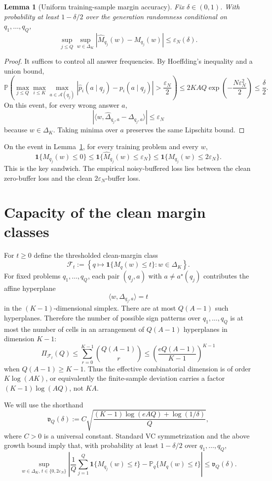 \documentclass[11pt]{article}
\newtheorem{lemma}{Lemma}
\newcommand{\A}{\mathcal A}
\newcommand{\Pp}{\mathbb P}
\newcommand{\one}{\mathbf 1}
\newcommand{\eps}{\varepsilon}
\begin{document}
\begin{lemma}[Uniform training-sample margin accuracy]
\label{lem:margin-accuracy}
Fix $\delta\in(0,1)$.  With probability at least $1-\delta/2$ over the generation randomness conditional on $q_1,\dots,q_Q$,
\[
\sup_{j\le Q}\sup_{w\in\Delta_K}
\left|\widehat M_{q_j}(w)-M_{q_j}(w)\right|
\le
\eps_N(\delta).
\]
\end{lemma}

\begin{proof}
It suffices to control all answer frequencies.  By Hoeffding's inequality and a union bound,
\[
\Pp\left(
\max_{j\le Q}\max_{i\le K}\max_{a\in\A(q_j)}
\left|\widehat p_i(a\mid q_j)-p_i(a\mid q_j)\right|
>
\frac{\eps_N}{2}
\right)
\le
2KAQ\exp\left(-\frac{N\eps_N^2}{2}\right)
\le \frac\delta2.
\]
On this event, for every wrong answer $a$,
\[
\left|\langle w,\widehat\Delta_{q_j,a}-\Delta_{q_j,a}\rangle\right|
\le
\eps_N
\]
because $w\in\Delta_K$.  Taking minima over $a$ preserves the same Lipschitz bound.
\end{proof}

On the event in Lemma~\ref{lem:margin-accuracy}, for every training problem and every $w$,
\[
\one\{M_{q_j}(w)\le 0\}
\le
\one\{\widehat M_{q_j}(w)\le \eps_N\}
\le
\one\{M_{q_j}(w)\le 2\eps_N\}.
\]
This is the key sandwich.  The empirical noisy-buffered loss lies between the clean zero-buffer loss and the clean $2\eps_N$-buffer loss.

\section{Capacity of the clean margin classes}

For $t\ge0$ define the thresholded clean-margin class
\[
\mathcal F_t
:=
\left\{q\mapsto \one\{M_q(w)\le t\}:w\in\Delta_K\right\}.
\]
For fixed problems $q_1,
\dots,q_Q$, each pair $(q_j,a)$ with $a\ne a^\star(q_j)$ contributes the affine hyperplane
\[
\langle w,\Delta_{q_j,a}\rangle=t
\]
in the $(K-1)$-dimensional simplex.  There are at most $Q(A-1)$ such hyperplanes.  Therefore the number of possible sign patterns over $q_1,\dots,q_Q$ is at most the number of cells in an arrangement of $Q(A-1)$ hyperplanes in dimension $K-1$:
\[
\Pi_{\mathcal F_t}(Q)
\le
\sum_{r=0}^{K-1}\binom{Q(A-1)}{r}
\le
\left(\frac{eQ(A-1)}{K-1}\right)^{K-1}
\]
when $Q(A-1)\ge K-1$.  Thus the effective combinatorial dimension is of order $K\log(AK)$, or equivalently the finite-sample deviation carries a factor $(K-1)\log(AQ)$, not $KA$.

We will use the shorthand
\[
\mathfrak v_Q(\delta)
:=
C
\sqrt{
\frac{(K-1)\log(eAQ)+\log(1/\delta)}{Q}
},
\]
where $C>0$ is a universal constant.  Standard VC symmetrization and the above growth bound imply that, with probability at least $1-\delta/2$ over $q_1,\dots,q_Q$,
\[
\sup_{w\in\Delta_K,\,t\in\{0,2\eps_N\}}
\left|
\frac1Q\sum_{j=1}^Q\one\{M_{q_j}(w)\le t\}
-
\Pp_q\{M_q(w)\le t\}
\right|
\le
\mathfrak v_Q(\delta).
\]
\end{document}
